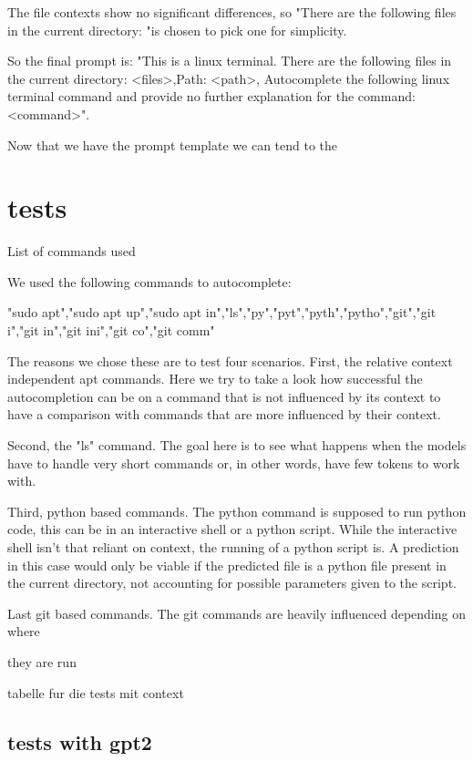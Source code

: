The file contexts show no significant differences, so "There are the following files in the current  directory: "is chosen to pick one for simplicity.



So the final prompt is: "This is a linux terminal. There are the following files in the current  directory: <files>,Path: <path>, Autocomplete the following linux terminal command and provide no further explanation for the command: <command>".


Now that we have the prompt template we can tend to the 

\section{tests}
List of commands used

We used the following commands to autocomplete:

"sudo apt","sudo apt up","sudo apt in","ls","py","pyt","pyth","pytho","git","git i","git in","git ini","git co","git comm"


The reasons we chose these are to test four scenarios. First, the relative context independent apt commands. Here we try to take a look how successful the autocompletion can be on a command that is not influenced by its context to have a comparison with commands that are more influenced by their context.


Second, the  "ls" command. The goal here is to see what happens when the models have to handle very short commands or, in other words, have few tokens to work with.


Third, python based commands. The python command is supposed to run python code, this can be in an interactive shell or a python script. While the interactive shell isn't that reliant on context, the running of a python script is. A prediction in this case would only be viable if the predicted file is a python file present in the current directory, not accounting for possible parameters given to the script.



Last git based commands. The git commands are heavily influenced depending on where 

they are run

tabelle fur die tests mit context
\pagebreak
\subsection{tests with gpt2}\raggedbottom

